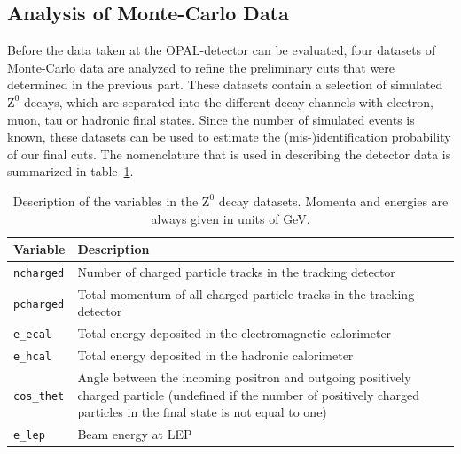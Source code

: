 \documentclass[11pt, a4paper]{article}
\numberwithin{equation}{section}
\begin{document}
\subsection{Analysis of Monte-Carlo Data}
\label{sec:analysis_mc_data}
Before the data taken at the OPAL-detector can be evaluated, four datasets of Monte-Carlo data are analyzed to refine the preliminary cuts that were determined in the previous part.
These datasets contain a selection of simulated $\mathrm{Z}^0$ decays, which are separated into the different decay channels with electron, muon, tau or hadronic final states.
Since the number of simulated events is known, these datasets can be used to estimate the (mis-)identification probability of our final cuts.
The nomenclature that is used in describing the detector data is summarized in table~\ref{tab:desc_variables}.

\begin{table}[H]
	\centering
	\begin{tabularx}{0.9\textwidth}{lX}
		\toprule
		\textbf{Variable} & \textbf{Description} \\
		\midrule		
		\texttt{ncharged} & Number of charged particle tracks in the tracking detector \\
		\texttt{pcharged} & Total momentum of all charged particle tracks in the tracking detector \\
		\texttt{e\_ecal} & Total energy deposited in the electromagnetic calorimeter \\
		\texttt{e\_hcal} & Total energy deposited in the hadronic calorimeter \\
		\texttt{cos\_thet} & Angle between the incoming positron and outgoing positively charged particle (undefined if the number of positively charged particles in the final state is not equal to one) \\
		\texttt{e\_lep} & Beam energy at LEP \\
		\bottomrule
	\end{tabularx}
	\caption{Description of the variables in the $\mathrm{Z}^0$ decay datasets. Momenta and energies are always given in units of GeV.}
	\label{tab:desc_variables}
\end{table}
\end{document}
